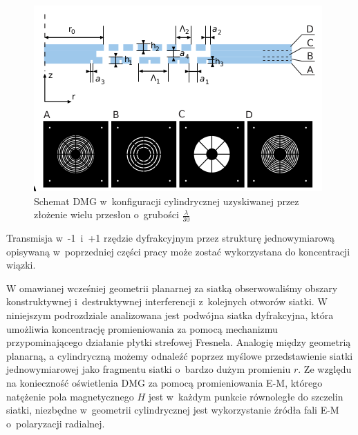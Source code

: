 \begin{figure}
	\includegraphics[width=\textwidth]{images/dmg/express_siatki.png}
	\caption{Schemat DMG w~konfiguracji cylindrycznej uzyskiwanej przez złożenie wielu przesłon o~grubości $\frac{\lambda}{30}$ \cite{Yavorskiy:14}}
	\label{fig:schem-cyl}
\end{figure}

Transmisja w~-1~i~+1 rzędzie dyfrakcyjnym przez strukturę jednowymiarową opisywaną w~poprzedniej części pracy może zostać wykorzystana do koncentracji wiązki. 

W omawianej wcześniej geometrii planarnej za siatką obserwowaliśmy obszary konstruktywnej i~destruktywnej interferencji z~kolejnych otworów siatki. W niniejszym podrozdziale analizowana jest podwójna siatka dyfrakcyjna, która umożliwia koncentrację promieniowania za pomocą mechanizmu przypominającego działanie płytki strefowej Fresnela. Analogię między geometrią planarną, a cylindryczną możemy odnaleźć poprzez myślowe przedstawienie siatki jednowymiarowej jako fragmentu siatki o~bardzo dużym promieniu $r$. Ze względu na konieczność oświetlenia DMG za pomocą promieniowania E-M, którego natężenie pola magnetycznego $H$ jest w~każdym punkcie równoległe do szczelin siatki, niezbędne w~geometrii cylindrycznej jest wykorzystanie źródła fali E-M o~polaryzacji radialnej. 


